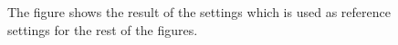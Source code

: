 \begin{figure}[h!]
\centering
{}
\caption
{
\label{fig:fire1}
The figure shows the result of the settings which is used as reference settings for the rest of the figures.
}
\end{figure}

